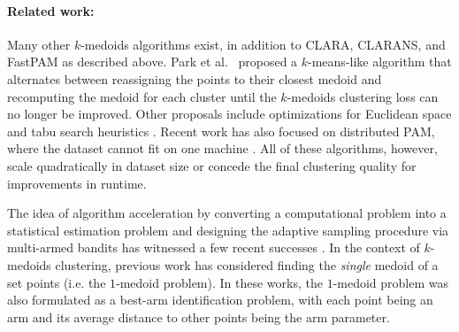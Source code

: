 
\paragraph{Related work:} Many other $k$-medoids algorithms exist, in addition to CLARA, CLARANS, and FastPAM as described above. Park et al.~\cite{park2009simple} proposed a $k$-means-like algorithm that alternates between reassigning the points to their closest medoid and recomputing the medoid for each cluster until the $k$-medoids clustering loss can no longer be improved. 
Other proposals include optimizations for Euclidean space and tabu search heuristics \cite{estivill2001robust}. Recent work has also focused on distributed PAM, where the dataset cannot fit on one machine \cite{song2017pamae}. All of these algorithms, however, scale quadratically in dataset size or concede the final clustering quality for improvements in runtime.

The idea of algorithm acceleration by converting a computational problem into a statistical estimation problem and designing the adaptive sampling procedure via multi-armed bandits has
witnessed a few recent successes \cite{chang2005adaptive,kocsis2006bandit,li2016hyperband,jamieson2016non,bagaria2018adaptive,zhang2019adaptive}.
In the context of $k$-medoids clustering, previous work \cite{bagaria2018medoids,baharav2019ultra} has considered finding the \textit{single} medoid of a set points (i.e. the $1$-medoid problem).
In these works, the $1$-medoid problem was also formulated as a best-arm identification problem, with each point being an arm and its average distance to other points being the arm parameter. 

